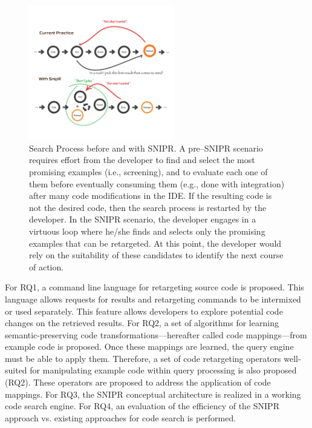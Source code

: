 \documentclass[conference]{IEEEtran}
\begin{document}
\begin{figure}[!t]
    \centering
    \includegraphics[width=2.5in]{images/searchprocess}
    \caption{Search Process before and with \uppercase{SnipR}. A pre--\uppercase{SnipR} scenario requires effort from the developer to find and select the most promising examples (i.e., screening), and to evaluate each one of them before eventually consuming them (e.g., done with integration) after many code modifications in the IDE. If the resulting code is not the desired code, then the search process is restarted by the developer. In the \uppercase{SnipR} scenario, the developer engages in a virtuous loop where he/she finds and selects only the promising examples that can be retargeted. At this point, the developer would rely on the suitability of these candidates to identify the next course of action.}
    \label{fig:retargeting}
\end{figure}
For RQ1, a command line language for retargeting source code is proposed. This language allows requests for results and retargeting commands to be intermixed or used separately. This feature allows developers to explore potential code changes on the retrieved results. For RQ2, a set of algorithms for learning semantic-preserving code transformations---hereafter called code mappings---from example code is proposed. Once these mappings are learned, the query engine must be able to apply them. Therefore, a set of code retargeting operators well-suited for manipulating example code within query processing is also proposed (RQ2). These operators are proposed to address the application of code mappings. For RQ3, the \uppercase{SnipR} conceptual architecture is realized in a working code search engine. For RQ4, an evaluation of the efficiency of the \uppercase{SnipR} approach vs. existing approaches for code search is performed. 
 
\end{document}
